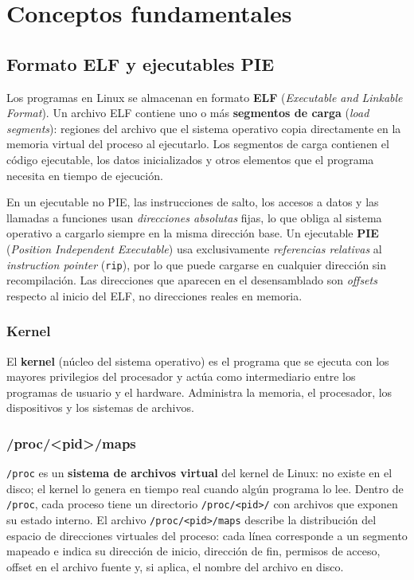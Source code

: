 \documentclass[10pt,a4paper]{article}
\begin{document}
\section{Conceptos fundamentales}

\subsection{Formato ELF y ejecutables PIE}

Los programas en Linux se almacenan en formato \textbf{ELF} (\textit{Executable and Linkable Format}). Un archivo ELF contiene uno o más \textbf{segmentos de carga} (\textit{load segments}): regiones del archivo que el sistema operativo copia directamente en la memoria virtual del proceso al ejecutarlo. Los segmentos de carga contienen el código ejecutable, los datos inicializados y otros elementos que el programa necesita en tiempo de ejecución.

En un ejecutable no PIE, las instrucciones de salto, los accesos a datos y las llamadas a funciones usan \emph{direcciones absolutas} fijas, lo que obliga al sistema operativo a cargarlo siempre en la misma dirección base. Un ejecutable \textbf{PIE} (\textit{Position Independent Executable}) usa exclusivamente \emph{referencias relativas} al \textit{instruction pointer} (\texttt{rip}), por lo que puede cargarse en cualquier dirección sin recompilación. Las direcciones que aparecen en el desensamblado son \textit{offsets} respecto al inicio del ELF, no direcciones reales en memoria.

\subsubsection*{Kernel}

El \textbf{kernel} (núcleo del sistema operativo) es el programa que se ejecuta con los mayores privilegios del procesador y actúa como intermediario entre los programas de usuario y el hardware. Administra la memoria, el procesador, los dispositivos y los sistemas de archivos.

\subsubsection*{/proc/\textless{}pid\textgreater{}/maps}

\texttt{/proc} es un \textbf{sistema de archivos virtual} del kernel de Linux: no existe en el disco; el kernel lo genera en tiempo real cuando algún programa lo lee. Dentro de \texttt{/proc}, cada proceso tiene un directorio \texttt{/proc/<pid>/} con archivos que exponen su estado interno. El archivo \texttt{/proc/<pid>/maps} describe la distribución del espacio de direcciones virtuales del proceso: cada línea corresponde a un segmento mapeado e indica su dirección de inicio, dirección de fin, permisos de acceso, offset en el archivo fuente y, si aplica, el nombre del archivo en disco.
\end{document}
